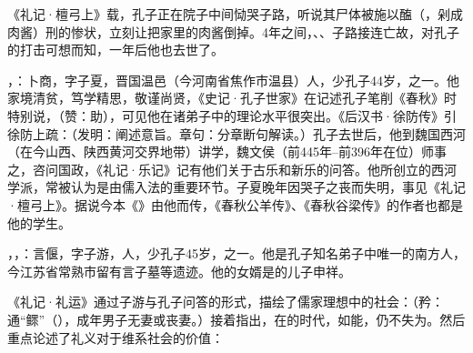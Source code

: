 《礼记·檀弓上》载，孔子正在院子中间恸哭子路，听说其尸体被施以醢（，剁成肉酱）刑的惨状，立刻让把家里的肉酱倒掉。4年之间，、、子路接连亡故，对孔子的打击可想而知，一年后他也去世了。

，：卜商，字子夏，晋国温邑（今河南省焦作市温县）人，少孔子44岁，之一。他家境清贫，笃学精思，敬谨尚贤，《史记·孔子世家》在记述孔子笔削《春秋》时特别说，（赞：助），可见他在诸弟子中的理论水平很突出。《后汉书·徐防传》引徐防上疏：（发明：阐述意旨。章句：分章断句解读。）孔子去世后，他到魏国西河（在今山西、陕西黄河交界地带）讲学，魏文侯（前445年--前396年在位）师事之，咨问国政，《礼记·乐记》记有他们关于古乐和新乐的问答。他所创立的西河学派，常被认为是由儒入法的重要环节。子夏晚年因哭子之丧而失明，事见《礼记·檀弓上》。据说今本《》由他而传，《春秋公羊传》、《春秋谷梁传》的作者也都是他的学生。

，，：言偃，字子游，人，少孔子45岁，之一。他是孔子知名弟子中唯一的南方人，今江苏省常熟市留有言子墓等遗迹。他的女婿是的儿子申祥。

《礼记·礼运》通过子游与孔子问答的形式，描绘了儒家理想中的社会：（矜：通“鳏”（），成年男子无妻或丧妻。）接着指出，在的时代，如能，仍不失为。然后重点论述了礼义对于维系社会的价值：

